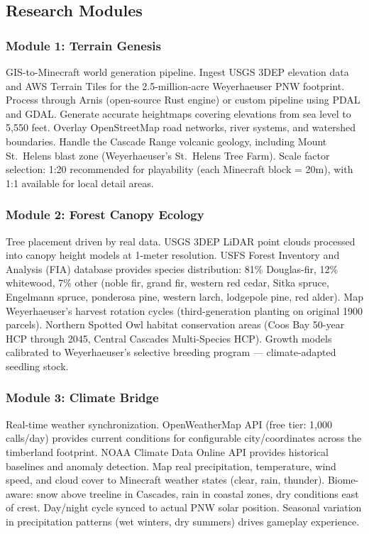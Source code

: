 \documentclass[11pt,letterpaper]{article}
\begin{document}
\subsection{Research Modules}

\subsubsection{Module 1: Terrain Genesis}
GIS-to-Minecraft world generation pipeline. Ingest USGS 3DEP elevation data and AWS Terrain Tiles for the 2.5-million-acre Weyerhaeuser PNW footprint. Process through Arnis (open-source Rust engine) or custom pipeline using PDAL and GDAL. Generate accurate heightmaps covering elevations from sea level to 5,550 feet. Overlay OpenStreetMap road networks, river systems, and watershed boundaries. Handle the Cascade Range volcanic geology, including Mount St.\ Helens blast zone (Weyerhaeuser's St.\ Helens Tree Farm). Scale factor selection: 1:20 recommended for playability (each Minecraft block = 20m), with 1:1 available for local detail areas.

\subsubsection{Module 2: Forest Canopy Ecology}
Tree placement driven by real data. USGS 3DEP LiDAR point clouds processed into canopy height models at 1-meter resolution. USFS Forest Inventory and Analysis (FIA) database provides species distribution: 81\% Douglas-fir, 12\% whitewood, 7\% other (noble fir, grand fir, western red cedar, Sitka spruce, Engelmann spruce, ponderosa pine, western larch, lodgepole pine, red alder). Map Weyerhaeuser's harvest rotation cycles (third-generation planting on original 1900 parcels). Northern Spotted Owl habitat conservation areas (Coos Bay 50-year HCP through 2045, Central Cascades Multi-Species HCP). Growth models calibrated to Weyerhaeuser's selective breeding program --- climate-adapted seedling stock.

\subsubsection{Module 3: Climate Bridge}
Real-time weather synchronization. OpenWeatherMap API (free tier: 1,000 calls/day) provides current conditions for configurable city/coordinates across the timberland footprint. NOAA Climate Data Online API provides historical baselines and anomaly detection. Map real precipitation, temperature, wind speed, and cloud cover to Minecraft weather states (clear, rain, thunder). Biome-aware: snow above treeline in Cascades, rain in coastal zones, dry conditions east of crest. Day/night cycle synced to actual PNW solar position. Seasonal variation in precipitation patterns (wet winters, dry summers) drives gameplay experience.
\end{document}
